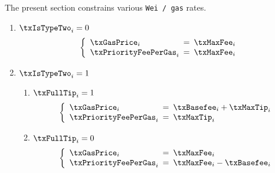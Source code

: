 The present section constrains various \texttt{Wei / gas} rates.
\begin{enumerate}
	\item \If $\txIsTypeTwo_{i} = 0$ \Then
		\[
			\left\{ \begin{array}{lcl}
				\txGasPrice  _{i} & \!\!\! = \!\!\! & \txMaxFee_{i} \\
				\txPriorityFeePerGas    _{i} & \!\!\! = \!\!\! & \txMaxFee_{i} \\
			\end{array} \right.
		\]
	\item \If $\txIsTypeTwo_{i} = 1$ \Then
		\begin{enumerate}
			\item \If $\txFullTip_{i} = 1$ \Then
				\[
					\left\{ \begin{array}{lcl}
						\txGasPrice  _{i} & \!\!\! = \!\!\! & \txBasefee_{i} + \txMaxTip_{i} \\
						\txPriorityFeePerGas    _{i} & \!\!\! = \!\!\! & \txMaxTip_{i}                  \\
					\end{array} \right.
				\]
			\item \If $\txFullTip_{i} = 0$ \Then
				\[
					\left\{ \begin{array}{lcl}
						\txGasPrice  _{i} & \!\!\! = \!\!\! & \txMaxFee_{i}                  \\
						\txPriorityFeePerGas    _{i} & \!\!\! = \!\!\! & \txMaxFee_{i} - \txBasefee_{i} \\
					\end{array} \right.
				\]
		\end{enumerate}
\end{enumerate}
